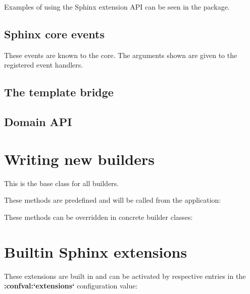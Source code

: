\documentclass[letterpaper,10pt,english]{sphinxmanual}
\begin{document}
Examples of using the Sphinx extension API can be seen in the 
package.


\subsection{Sphinx core events}
\label{ext/appapi:sphinx-core-events}\label{ext/appapi:events}
These events are known to the core.  The arguments shown are given to the
registered event handlers.


\subsection{The template bridge}
\label{ext/appapi:the-template-bridge}\label{ext/appapi:template-bridge}

\subsection{Domain API}
\label{ext/appapi:id5}\label{ext/appapi:module-sphinx.domains}\label{ext/appapi:domain-api}

\section{Writing new builders}
\label{ext/builderapi:writing-builders}\label{ext/builderapi:writing-new-builders}\label{ext/builderapi::doc}

\begin{fulllineitems}
\label{ext/builderapi:sphinx.builders.Builder}
This is the base class for all builders.

These methods are predefined and will be called from the application:

These methods can be overridden in concrete builder classes:

\end{fulllineitems}



\section{Builtin Sphinx extensions}
\label{extensions:builtin-sphinx-extensions}
These extensions are built in and can be activated by respective entries in the
{\color{red}\bfseries{}:confval:{}`extensions{}`} configuration value:
\end{document}
